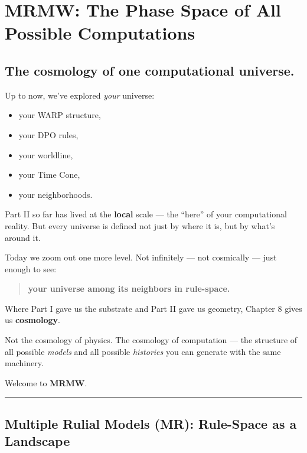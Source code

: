\chapter{MRMW: The Phase Space of All Possible Computations}\label{chapter-8-mrmw-the-phase-space-of-all-possible-computations}

\section{\texorpdfstring{\textbf{The cosmology of one computational
universe.}}{The cosmology of one computational universe.}}\label{the-cosmology-of-one-computational-universe.}

Up to now, we've explored \emph{your} universe:

\begin{itemize}
\tightlist
\item
  your WARP structure,\\
\item
  your DPO rules,
\item
  your worldline,
\item
  your Time Cone,
\item
  your neighborhoods.
\end{itemize}

Part II so far has lived at the \textbf{local} scale --- the ``here'' of
your computational reality. But every universe is defined not just by
where it is, but by what's around it.

Today we zoom out one more level. Not infinitely --- not cosmically ---
just enough to see:

\begin{quote}
\textbf{your universe among its neighbors in rule-space.}
\end{quote}

Where Part I gave us the substrate and Part II gave us geometry, Chapter
8 gives us \textbf{cosmology}.

Not the cosmology of physics. The cosmology of computation --- the
structure of all possible \emph{models} and all possible
\emph{histories} you can generate with the same machinery.

Welcome to \textbf{MRMW}.

\begin{center}\rule{0.5\linewidth}{0.5pt}\end{center}

\section{\texorpdfstring{\textbf{Multiple Rulial Models (MR):
Rule-Space as a
Landscape}}{8.1 --- Multiple Rulial Models (MR): Rule-Space as a Landscape}}\label{multiple-rulial-models-mr-rule-space-as-a-landscape}

